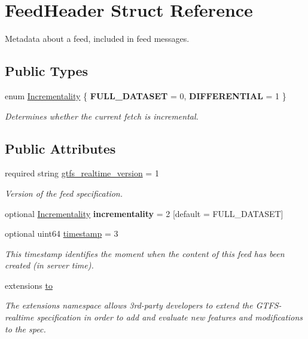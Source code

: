 \hypertarget{structFeedHeader}{}\section{Feed\+Header Struct Reference}
\label{structFeedHeader}


Metadata about a feed, included in feed messages.  


\subsection*{Public Types}
\begin{DoxyCompactItemize}
\item 
enum \hyperlink{structFeedHeader_a014e597904baf6375bc0b83aeb31b825}{Incrementality} \{ {\bfseries F\+U\+L\+L\+\_\+\+D\+A\+T\+A\+S\+ET} = 0, 
{\bfseries D\+I\+F\+F\+E\+R\+E\+N\+T\+I\+AL} = 1
 \}\begin{DoxyCompactList}\small\item\em Determines whether the current fetch is incremental. \end{DoxyCompactList}
\end{DoxyCompactItemize}
\subsection*{Public Attributes}
\begin{DoxyCompactItemize}
\item 
required string \hyperlink{structFeedHeader_ab5e670b9182621dd8990b827ee028ee0}{gtfs\+\_\+realtime\+\_\+version} = 1
\begin{DoxyCompactList}\small\item\em Version of the feed specification. \end{DoxyCompactList}\item 
optional \hyperlink{structFeedHeader_a014e597904baf6375bc0b83aeb31b825}{Incrementality} {\bfseries incrementality} = 2 \mbox{[}default = F\+U\+L\+L\+\_\+\+D\+A\+T\+A\+S\+ET\mbox{]}\hypertarget{structFeedHeader_a4c34168892e27960b94aac08c845c46d}{}\label{structFeedHeader_a4c34168892e27960b94aac08c845c46d}

\item 
optional uint64 \hyperlink{structFeedHeader_ad49340967af0c1b646b59f918dc3325a}{timestamp} = 3
\begin{DoxyCompactList}\small\item\em This timestamp identifies the moment when the content of this feed has been created (in server time). \end{DoxyCompactList}\item 
extensions \hyperlink{structFeedHeader_a83d02812036b0fcdcb2c2a60f63d0547}{to}
\begin{DoxyCompactList}\small\item\em The extensions namespace allows 3rd-\/party developers to extend the G\+T\+F\+S-\/realtime specification in order to add and evaluate new features and modifications to the spec. \end{DoxyCompactList}\end{DoxyCompactItemize}


